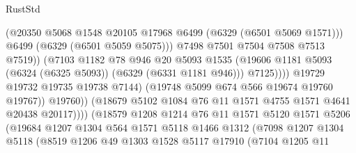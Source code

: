 \begin{lexlean}{RustStd}
\begin{coremodule}
{{                                          (@20350
                                            @5068
                                            @1548
                                            @20105
                                            @17968
                                            @6499
                                            (@6329 (@6501 @5069 @1571)))
                                          @6499
                                          (@6329 (@6501 @5059 @5075)))
                                        @7498
                                        @7501
                                        @7504
                                        @7508
                                        @7513
                                        @7519))
                                    (@7103
                                      @1182
                                      @78
                                      @946
                                      @20
                                      @5093
                                      @1535
                                      (@19606
                                        @1181
                                        @5093
                                        (@6324 (@6325 @5093))
                                        (@6329 (@6331 @1181 @946)))
                                      @7125))))
                              @19729
                              @19732
                              @19735
                              @19738
                              @7144)
                            (@19748 @5099 @674 @566 @19674 @19760 @19767))
                          @19760))
                      (@18679 @5102 @1084 @76 @11 @1571 @4755 @1571 @4641 @20438 @20117))))
                (@18579
                  @1208
                  @1214
                  @76
                  @11
                  @1571
                  @5120
                  @1571
                  @5206
                  (@19684
                    @1207
                    @1304
                    @564
                    @1571
                    @5118
                    @1466
                    @1312
                    (@7098
                      @1207
                      @1304
                      @5118
                      (@8519
                        @1206
                        @49
                        @1303
                        @1528
                        @5117
                        @17910
                        (@7104
                          @1205
                          @11
}}
\end{coremodule}
\end{lexlean}
